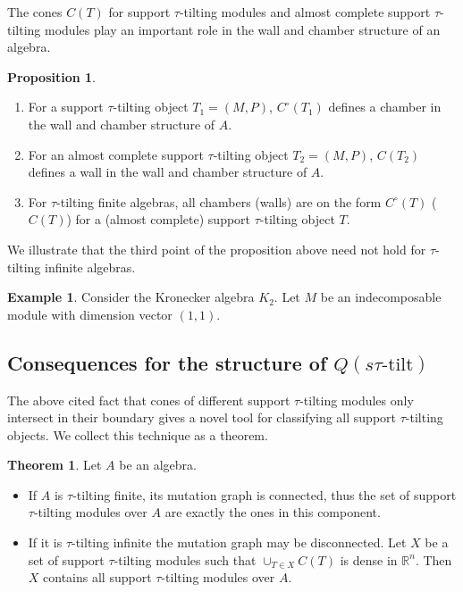 \documentclass[]{article}
\theoremstyle{definition}
\newtheorem{theorem}{Theorem}[section]
\newtheorem{proposition}{Proposition}[section]
\newtheorem{example}{Example}[section]
\newcommand{\tu}{\ensuremath{\tau}}
\begin{document}
The cones $C(T)$ for support \tu-tilting modules and almost complete support \tu-tilting modules play an important role in the wall and chamber structure of an algebra.

\begin{proposition}\cite[Proposition 3.15, Corollary 3.16, Corollary 3.21]{Br_stle_2019}\label{tau-wall-chamber-result}
	\begin{enumerate}
		\item For a support \tu-tilting object $T_1 = (M,P)$, $C^\circ(T_1)$ defines a chamber in the wall and chamber structure of $A$.
		\item For an almost complete support \tu-tilting object $T_2 = (M,P)$, $C(T_2)$ defines a wall in the wall and chamber structure of $A$.
		\item For \tu-tilting finite algebras, all chambers (walls) are on the form $C^\circ(T)$ ($C(T)$) for a (almost complete) support \tu-tilting object $T$.
		
	\end{enumerate}
\end{proposition}

We illustrate that the third point of the proposition above need not hold for \tu-tilting infinite algebras.

\begin{example}
	Consider the Kronecker algebra $K_2$. Let $M$ be an indecomposable module with dimension vector $(1,1)$. 
\end{example}


\subsection{Consequences for the structure of $Q(s\tu\text{-tilt})$}

The above cited fact that cones of different support \tu-tilting modules only intersect in their boundary gives a novel tool for classifying all support \tu-tilting objects. We collect this technique as a theorem.

\begin{theorem}
	Let $A$ be an algebra.
	
	\begin{itemize}
		\item If $A$ is \tu-tilting finite, its mutation graph is connected, thus the set of support \tu-tilting modules over $A$ are exactly the ones in this component.
		\item If it is \tu-tilting infinite the mutation graph may be disconnected. Let $X$ be a set of support \tu-tilting modules such that $\cup_{T \in X} C(T)$ is dense in $\mathbb{R}^n$. Then $X$ contains all support \tu-tilting modules over $A$.
		
	\end{itemize}
\end{theorem}
\end{document}
